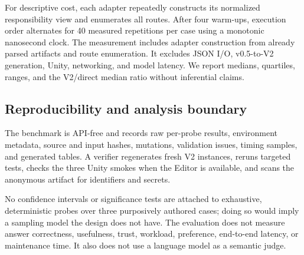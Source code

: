 For descriptive cost, each adapter repeatedly constructs its normalized
responsibility view and enumerates all routes.  After four warm-ups, execution
order alternates for 40 measured repetitions per case using a monotonic
nanosecond clock.  The measurement includes adapter construction from already
parsed artifacts and route enumeration.  It excludes JSON I/O, v0.5-to-V2
generation, Unity, networking, and model latency.  We report medians,
quartiles, ranges, and the V2/direct median ratio without inferential claims.

\subsection{Reproducibility and analysis boundary}

The benchmark is API-free and records raw per-probe results, environment
metadata, source and input hashes, mutations, validation issues, timing samples,
and generated tables.  A verifier regenerates fresh V2 instances, reruns
targeted tests, checks the three Unity smokes when the Editor is available, and
scans the anonymous artifact for identifiers and secrets.

No confidence intervals or significance tests are attached to exhaustive,
deterministic probes over three purposively authored cases; doing so would imply
a sampling model the design does not have.  The evaluation does not measure
answer correctness, usefulness, trust, workload, preference, end-to-end
latency, or maintenance time.  It also does not use a language model as a
semantic judge.

